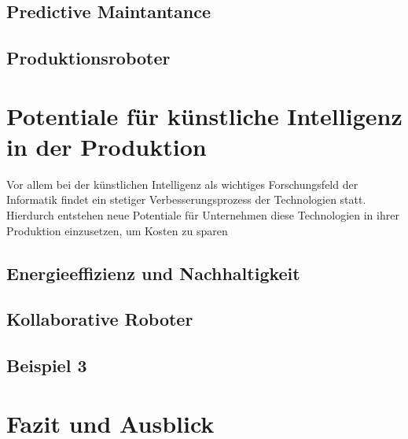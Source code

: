\documentclass[a4paper,12pt, german]{report}
\begin{document}
\section{Predictive Maintantance}


\section{Produktionsroboter}



\chapter{Potentiale für künstliche Intelligenz in der Produktion}

Vor allem bei der künstlichen Intelligenz als wichtiges Forschungsfeld der Informatik findet ein stetiger Verbesserungsprozess der Technologien statt. Hierdurch entstehen neue Potentiale für Unternehmen diese Technologien in ihrer Produktion einzusetzen, um Kosten zu sparen









\section{Energieeffizienz und Nachhaltigkeit}

\section{Kollaborative Roboter}

\section{Beispiel 3}


\chapter{Fazit und Ausblick}

\listoffigures

\clearpage




\appendix
\end{document}
